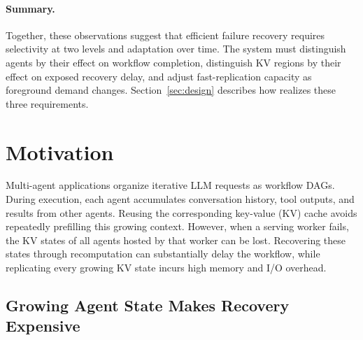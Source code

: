 \paragraph{Summary.}
Together, these observations suggest that efficient failure recovery requires selectivity at two levels and adaptation over time. The system must distinguish agents by their effect on workflow completion, distinguish KV regions by their effect on exposed recovery delay, and adjust fast-replication capacity as foreground demand changes. Section~\ref{sec:design} describes how \system realizes these three requirements.


\iffalse
\section{Motivation} \label{sec:motivation} 

Multi-agent applications organize iterative LLM requests as workflow DAGs. During execution, each agent accumulates conversation history, tool outputs, and results from other agents. Reusing the corresponding key-value (KV) cache avoids repeatedly prefilling this growing context. However, when a serving worker fails, the KV states of all agents hosted by that worker can be lost. Recovering these states through recomputation can substantially delay the workflow, while replicating every growing KV state incurs high memory and I/O overhead. 





\subsection{Growing Agent State Makes Recovery Expensive} \label{sec:motivation:growth} 


